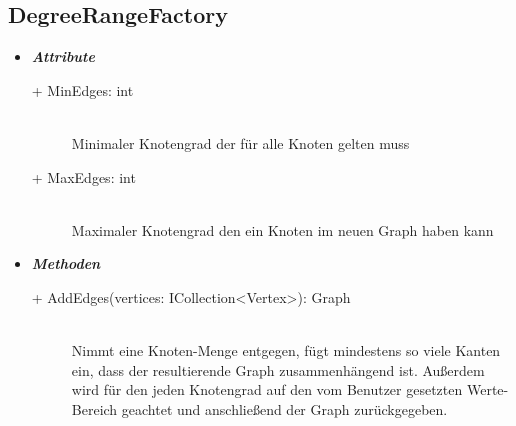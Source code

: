 \documentclass[13pt]{scrreprt}
\begin{document}
	\subsection{DegreeRangeFactory}
	\begin{itemize}[label = {$\circ$}]
		\item {\large \textbf{\textit{Attribute}}\par}
		\begin{description}
			\item [+ MinEdges: int] \hfill \\ Minimaler Knotengrad der für alle Knoten gelten muss
			\item [+ MaxEdges: int] \hfill \\ Maximaler Knotengrad den ein Knoten im neuen Graph haben kann
		\end{description}
		\item {\large \textbf{\textit{Methoden}}\par}
		\begin{description}
			\item [+ AddEdges(vertices: ICollection<Vertex>): Graph] \hfill \\ Nimmt eine Knoten-Menge entgegen, fügt mindestens so viele Kanten ein, dass der resultierende Graph zusammenhängend ist. Außerdem wird für den jeden Knotengrad auf den vom Benutzer gesetzten Werte-Bereich geachtet und anschließend der Graph zurückgegeben.
		\end{description}
	\end{itemize}
\end{document}
